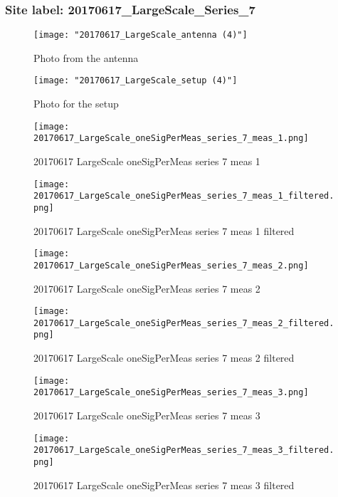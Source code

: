 \subsubsection{Site label: 20170617\_LargeScale\_Series\_7}
\begin{figure}[ht] \caption{Photo from the antenna}
\texttt{[image: "20170617\_LargeScale\_antenna (4)"]}\centering\end{figure}
\begin{figure}[ht] \caption{Photo for the setup}
\texttt{[image: "20170617\_LargeScale\_setup (4)"]}\centering\end{figure}
\begin{figure}[ht] \caption{20170617 LargeScale oneSigPerMeas series 7 meas 1}
\texttt{[image: 20170617\_LargeScale\_oneSigPerMeas\_series\_7\_meas\_1.png]}\centering\end{figure}
\begin{figure}[ht] \caption{20170617 LargeScale oneSigPerMeas series 7 meas 1 filtered}
\texttt{[image: 20170617\_LargeScale\_oneSigPerMeas\_series\_7\_meas\_1\_filtered.png]}\centering\end{figure}
\begin{figure}[ht] \caption{20170617 LargeScale oneSigPerMeas series 7 meas 2}
\texttt{[image: 20170617\_LargeScale\_oneSigPerMeas\_series\_7\_meas\_2.png]}\centering\end{figure}
\begin{figure}[ht] \caption{20170617 LargeScale oneSigPerMeas series 7 meas 2 filtered}
\texttt{[image: 20170617\_LargeScale\_oneSigPerMeas\_series\_7\_meas\_2\_filtered.png]}\centering\end{figure}
\begin{figure}[ht] \caption{20170617 LargeScale oneSigPerMeas series 7 meas 3}
\texttt{[image: 20170617\_LargeScale\_oneSigPerMeas\_series\_7\_meas\_3.png]}\centering\end{figure}
\begin{figure}[ht] \caption{20170617 LargeScale oneSigPerMeas series 7 meas 3 filtered}
\texttt{[image: 20170617\_LargeScale\_oneSigPerMeas\_series\_7\_meas\_3\_filtered.png]}\centering\end{figure}
\clearpage
